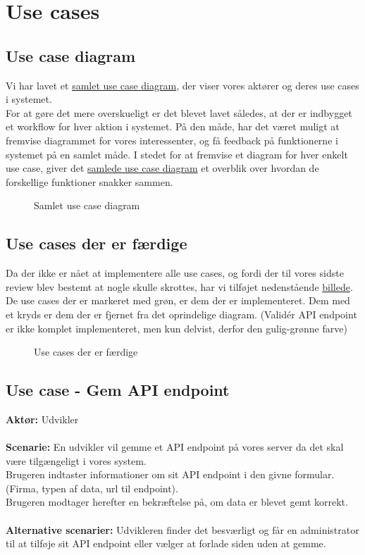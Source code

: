 \section{Use cases}
\subsection{Use case diagram}
Vi har lavet et \hyperref[fig:usecase-complete]{samlet use case diagram}, der viser vores aktører og deres use cases i systemet.\\
For at gøre det mere overskueligt er det blevet lavet således, at der er indbygget et workflow for hver aktion i systemet.
På den måde, har det været muligt at fremvise diagrammet for vores interessenter, og få feedback på funktionerne i systemet på en samlet måde.
I stedet for at fremvise et diagram for hver enkelt use case, giver det \hyperref[fig:usecase-complete]{samlede use case diagram} et overblik over hvordan de forskellige funktioner snakker sammen.
\begin{figure}[H]
    \caption{Samlet use case diagram}
    \label{fig:usecase-complete}
\end{figure}
\subsection{Use cases der er færdige}
Da der ikke er nået at implementere alle use cases, og fordi der til vores sidste review blev bestemt at nogle skulle skrottes,
har vi tilføjet nedenstående \hyperref[fig:usecase-done]{billede}.
\\
De use cases der er markeret med grøn, er dem der er implementeret. Dem med et kryds er dem der er fjernet fra det oprindelige diagram.
(Validér API endpoint er ikke komplet implementeret, men kun delvist, derfor den gulig-grønne farve)
\begin{figure}[H]
    \caption{Use cases der er færdige}
    \label{fig:usecase-done}
\end{figure}
\subsection{Use case - Gem API endpoint}
\textbf{Aktør:} Udvikler
\\\\
\textbf{Scenarie:} En udvikler vil gemme et API endpoint på vores server da det skal være tilgængeligt i vores system. \\
Brugeren indtaster informationer om sit API endpoint i den givne formular. (Firma, typen af data, url til endpoint). \\
Brugeren modtager herefter en bekræftelse på, om data er blevet gemt korrekt.
\\\\
\textbf{Alternative scenarier:} Udvikleren finder det besværligt og får en administrator til at tilføje sit API endpoint
eller vælger at forlade siden uden at gemme.
